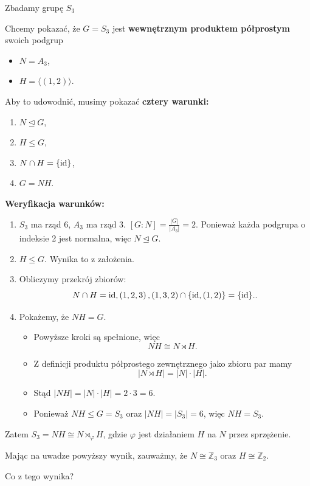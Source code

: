 \begin{eg}		
	Zbadamy grupę $S_3$
	\begin{goal}
		Chcemy pokazać, że $G = S_3$ jest  \textbf{wewnętrznym produktem półprostym} swoich podgrup 
		\begin{itemize}
			\item $N= A_3$,
			\item $H = \langle \left( 1,2 \right)  \rangle$.
		\end{itemize}
	
	\end{goal}
		Aby to udowodnić, musimy pokazać \textbf{cztery warunki:}
	\begin{enumerate}[label=\textbf{\arabic*.}]
		\item $N\unlhd G$,
		\item $H\le G$,
		\item $N \cap H = \{ \operatorname{id}\} $,
		\item $G = NH$.
	\end{enumerate}

	\textbf{Weryfikacja warunków:} 
\begin{enumerate}[label=\textbf{Warunek \arabic*.}, wide]
		\item $S_3$ ma rząd 6, $A_3$ ma rząd 3. $\left[ G:N \right] = \frac{\left| G \right| }{\left| A_{3} \right| } = 2$. Ponieważ każda podgrupa o indeksie 2 jest normalna, więc  $N\unlhd G$.
		\item $H\le G$. Wynika to z założenia.
		\item Obliczymy przekrój zbiorów: \[
				N \cap H = {\operatorname{id}, \left( 1,2,3 \right), \left( 1,3,2 \right) } \cap \{\operatorname{id}, \left( 1,2 \right) \} = \{ \operatorname{id}\}.
		.\] 
		\item Pokażemy, że $NH = G$.
			\begin{itemize}[leftmargin=3.5em]
				\item Powyższe kroki są spełnione, więc \[
				NH \cong N\rtimes H
				.\] 
			\item Z definicji produktu półprostego zewnętrznego jako zbioru par mamy
				\[
				\left| N\rtimes H \right| = \left| N \right| \cdot \left| H \right| 
				.\] 
			\item Stąd $\left| NH \right| = \left| N \right| \cdot \left| H \right| = 2 \cdot 3 = 6$.
			\item Ponieważ $NH \le G=S_3$ oraz $\left| NH \right| = \left| S_3 \right| = 6$, więc $NH = S_3$.
			\end{itemize}
	\end{enumerate}
	
	Zatem $S_3 = NH \cong N\rtimes_{\varphi}H$, gdzie $\varphi$ jest działaniem $H$ na $N$ przez sprzężenie.
\end{eg}
\begin{remark}
	Mając na uwadze powyższy wynik, zauważmy, że $N\cong \mathbb{Z}_3$ oraz $H \cong\mathbb{Z}_2$. 
\end{remark}
\begin{question}
	Co z tego wynika?
\end{question}

